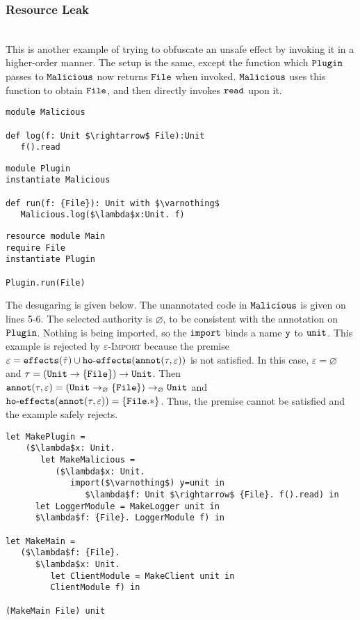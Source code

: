 \subsubsection{Resource Leak}~\\

This is another example of trying to obfuscate an unsafe effect by invoking it in a higher-order manner. The setup is the same, except the function which $\mathtt{Plugin}$ passes to $\mathtt{Malicious}$ now returns $\mathtt{File}$ when invoked. $\mathtt{Malicious}$ uses this function to obtain $\mathtt{File}$, and then directly invokes $\mathtt{read}$ upon it.

\begin{lstlisting}
module Malicious

def log(f: Unit $\rightarrow$ File):Unit
   f().read
\end{lstlisting}

\begin{lstlisting}
module Plugin
instantiate Malicious

def run(f: {File}): Unit with $\varnothing$
   Malicious.log($\lambda$x:Unit. f)
\end{lstlisting}

\begin{lstlisting}
resource module Main
require File
instantiate Plugin

Plugin.run(File)
\end{lstlisting}

The desugaring is given below. The unannotated code in $\mathtt{Malicious}$ is given on lines 5-6. The selected authority is $\varnothing$, to be consistent with the annotation on $\mathtt{Plugin}$. Nothing is being imported, so the $\mathtt{import}$ binds a name $\mathtt{y}$ to $\mathtt{unit}$. This example is rejected by \textsc{$\varepsilon$-Import} because the premise $\varepsilon = \mathtt{effects}(\hat \tau) \cup \mathtt{ho \hbox{-} effects}(\mathtt{annot}(\tau, \varepsilon))$ is not satisfied. In this case, $\varepsilon = \varnothing$ and $\tau = \mathtt{ (Unit \rightarrow \{ File \}) \rightarrow Unit }$. Then $\mathtt{annot}(\tau, \varepsilon) = \mathtt{ (Unit \rightarrow_{\varnothing} \{ File \}) \rightarrow_{\varnothing} Unit }$ and $\mathtt{ho \hbox{-} effects}(\mathtt{annot}(\tau, \varepsilon)) = \{ \mathtt{File.*} \}$. Thus, the premise cannot be satisfied and the example safely rejects.


\begin{lstlisting}
let MakePlugin =
	($\lambda$x: Unit.
	   let MakeMalicious =
	      ($\lambda$x: Unit.
	         import($\varnothing$) y=unit in
	            $\lambda$f: Unit $\rightarrow$ {File}. f().read) in
      let LoggerModule = MakeLogger unit in
      $\lambda$f: {File}. LoggerModule f) in

let MakeMain =
   ($\lambda$f: {File}.
      $\lambda$x: Unit.
         let ClientModule = MakeClient unit in
         ClientModule f) in

(MakeMain File) unit
\end{lstlisting}






